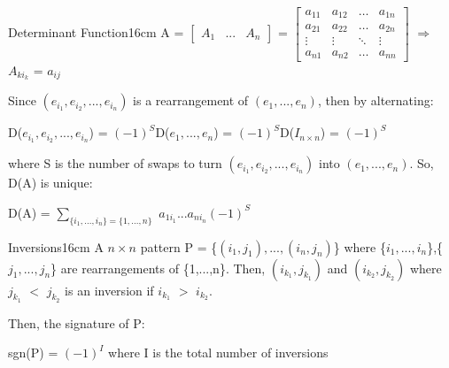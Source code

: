 \begin{definition}{Determinant Function}{16cm}
        \hspace{0.5cm}
        A =
        $\begin{bmatrix}
            A_1 & ... & A_n
        \end{bmatrix}$ =
        $\begin{bmatrix}
            a_{11} & a_{12} & \hdots & a_{1n} \\
            a_{21} & a_{22} & \hdots & a_{2n} \\
            \vdots & \vdots & \ddots & \vdots \\
            a_{n1} & a_{n2} & \hdots & a_{nn}
        \end{bmatrix}$
        \hspace{1cm}
        $\Rightarrow$
        \hspace{1cm}
        $A_{k{i_k}}$ = $a_{ij}$

        Since $(e_{i_1},e_{i_2},...,e_{i_n})$
        is a rearrangement of $(e_1,...,e_n)$, then by alternating:

        \hspace{0.5cm}
        D($e_{i_1},e_{i_2},...,e_{i_n}$)
        = $(-1)^S$D($e_1,...,e_n$)
        = $(-1)^S$D($I_{n \times n}$)
        = $(-1)^S$

        where S is the number of swaps to turn
        $(e_{i_1},e_{i_2},...,e_{i_n})$ into $(e_1,...,e_n)$.
        So, D(A) is unique:

        \hspace{0.5cm}
        D(A) = $\sum_{\{i_1,...,i_n\} = \{1,...,n\}}$
                $a_{1i_1}...a_{ni_n}(-1)^S$
    \end{definition}

    \newpage



    \begin{definition}{Inversions}{16cm}
        A $n \times n$ {\color{lblue} pattern} P = \{$(i_1,j_1),...,(i_n,j_n)$\}
        where \{$i_1,...,i_n$\},\{$j_1,...,j_n$\} are rearrangements of
        \{1,...,n\}.
        Then, $(i_{k_1},j_{k_1})$ and $(i_{k_2},j_{k_2})$ where
        $j_{k_1}$ $<$ $j_{k_2}$ is an {\color{lblue} inversion}
        if $i_{k_1}$ $>$ $i_{k_2}$.

        Then, the {\color{lblue} signature} of P:

        \hspace{0.5cm}
        sgn(P) = $(-1)^I$
        \hspace{1cm}
        where I is the total number of inversions
    \end{definition}

